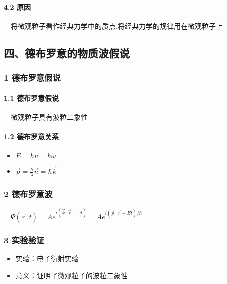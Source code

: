 \documentclass[UTF8,twocolumn]{ctexart}
\providecommand{\tightlist}{%
  \setlength{\itemsep}{0pt}\setlength{\parskip}{0pt}}
\let\oldparagraph\paragraph
\renewcommand{\paragraph}[1]{\oldparagraph{#1}\mbox{}}
\begin{document}
\hypertarget{ux539fux56e0}{%
\paragraph{{ }4.2 原因}\label{ux539fux56e0}}

 将微观粒子看作经典力学中的质点,将经典力学的规律用在微观粒子上

\hypertarget{ux56dbux5fb7ux5e03ux7f57ux610fux7684ux7269ux8d28ux6ce2ux5047ux8bf4}{%
\subsection{四、德布罗意的物质波假说}\label{ux56dbux5fb7ux5e03ux7f57ux610fux7684ux7269ux8d28ux6ce2ux5047ux8bf4}}

\hypertarget{ux5fb7ux5e03ux7f57ux610fux5047ux8bf4}{%
\subsubsection{1
德布罗意假说}\label{ux5fb7ux5e03ux7f57ux610fux5047ux8bf4}}

\hypertarget{ux5fb7ux5e03ux7f57ux610fux5047ux8bf4-1}{%
\paragraph{{ }1.1
德布罗意假说}\label{ux5fb7ux5e03ux7f57ux610fux5047ux8bf4-1}}

 微观粒子具有波粒二象性

\hypertarget{ux5fb7ux5e03ux7f57ux610fux5173ux7cfb}{%
\paragraph{{ }1.2
德布罗意关系}\label{ux5fb7ux5e03ux7f57ux610fux5173ux7cfb}}

\begin{itemize}
\tightlist
\item
  \(E=h\upsilon=\hbar\omega\)
\item
  \(\vec{p}=\frac{h}{\lambda}\vec{n}=\hbar\vec{k}\)
\end{itemize}

\hypertarget{ux5fb7ux5e03ux7f57ux610fux6ce2}{%
\subsubsection{2 德布罗意波}\label{ux5fb7ux5e03ux7f57ux610fux6ce2}}

 \(\Psi(\vec{r},t)=Ae^{i(\vec{k}\cdot\vec{r}-\omega t)}=Ae^{i(\vec{p}\cdot\vec{r}-Et)/\hbar}\)

\hypertarget{ux5b9eux9a8cux9a8cux8bc1}{%
\subsubsection{3 实验验证}\label{ux5b9eux9a8cux9a8cux8bc1}}

\begin{itemize}
\tightlist
\item
  实验：电子衍射实验
\item
  意义：证明了微观粒子的波粒二象性
\end{itemize}
\end{document}
